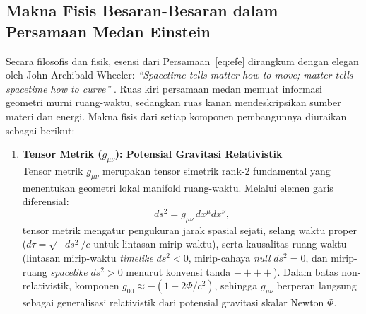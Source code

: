 \subsection{Makna Fisis Besaran-Besaran dalam Persamaan Medan Einstein}
\label{subsec:makna-fisis-efe}

Secara filosofis dan fisik, esensi dari Persamaan~\eqref{eq:efe} dirangkum dengan elegan oleh John Archibald Wheeler: \textit{``Spacetime tells matter how to move; matter tells spacetime how to curve''} \parencite{Misner1973Gravitation}. Ruas kiri persamaan medan memuat informasi geometri murni ruang-waktu, sedangkan ruas kanan mendeskripsikan sumber materi dan energi. Makna fisis dari setiap komponen pembangunnya diuraikan sebagai berikut:

\begin{enumerate}[label=(\alph*), wide=0pt, leftmargin=*]
    \item \textbf{Tensor Metrik ($g_{\mu\nu}$): Potensial Gravitasi Relativistik}\\
    Tensor metrik $g_{\mu\nu}$ merupakan tensor simetrik rank-2 fundamental yang menentukan geometri lokal manifold ruang-waktu. Melalui elemen garis diferensial:
    \begin{equation}
        ds^2 = g_{\mu\nu}\, dx^\mu dx^\nu,
        \label{eq:line-element-def}
    \end{equation}
    tensor metrik mengatur pengukuran jarak spasial sejati, selang waktu proper ($d\tau = \sqrt{-ds^2}/c$ untuk lintasan mirip-waktu), serta kausalitas ruang-waktu (lintasan mirip-waktu \textit{timelike} $ds^2 < 0$, mirip-cahaya \textit{null} $ds^2 = 0$, dan mirip-ruang \textit{spacelike} $ds^2 > 0$ menurut konvensi tanda $-+++$). Dalam batas non-relativistik, komponen $g_{00} \approx -(1 + 2\Phi/c^2)$, sehingga $g_{\mu\nu}$ berperan langsung sebagai generalisasi relativistik dari potensial gravitasi skalar Newton $\Phi$.


\end{enumerate}
